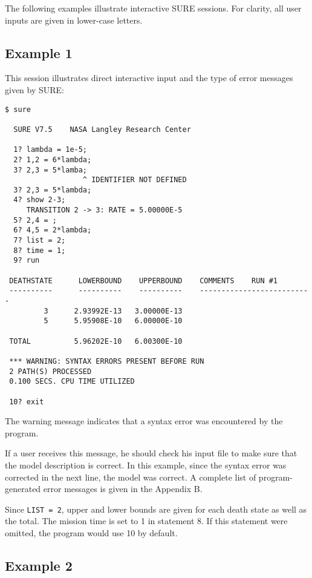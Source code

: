The following examples illustrate interactive SURE sessions.  For clarity, all
user inputs are given in lower-case letters.

\subsection{Example 1 }

This session illustrates direct interactive input and the type of
error messages given by SURE:
\begin{verbatim}
$ sure

  SURE V7.5    NASA Langley Research Center

  1? lambda = 1e-5;
  2? 1,2 = 6*lambda;
  3? 2,3 = 5*lamba;
                  ^ IDENTIFIER NOT DEFINED
  3? 2,3 = 5*lambda;
  4? show 2-3;
     TRANSITION 2 -> 3: RATE = 5.00000E-5
  5? 2,4 = ;
  6? 4,5 = 2*lambda;
  7? list = 2;
  8? time = 1;
  9? run

 DEATHSTATE      LOWERBOUND    UPPERBOUND    COMMENTS    RUN #1
 ----------      ----------    ----------    --------------------------
         3      2.93992E-13   3.00000E-13
         5      5.95908E-10   6.00000E-10

 TOTAL          5.96202E-10   6.00300E-10

 *** WARNING: SYNTAX ERRORS PRESENT BEFORE RUN
 2 PATH(S) PROCESSED
 0.100 SECS. CPU TIME UTILIZED

 10? exit 
\end{verbatim}
The warning message indicates that a syntax error was encountered by the program.

If a user receives this message, he should check his input file to make sure
that the model description is correct.  In this example, since the syntax
error was corrected in the next line, the model was correct.  A complete list
of program-generated error messages is given in the Appendix B.

Since \verb|LIST = 2|, upper and lower bounds are given for each death state
as well as the total.  The mission time is set to 1 in statement 8.  If this
statement were omitted, the program would use 10 by default.

\subsection{Example 2 }


